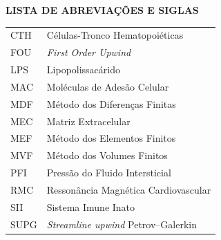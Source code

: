 \clearpage
\clearpage
\begin{center}
\textbf{LISTA DE ABREVIAÇÕES E SIGLAS}
\end{center}

\vspace*{1.cm}

\doublespacing  \begin{tabular}{l l}
CTH& 	 Células-Tronco Hematopoiéticas\\
FOU& 	 \textit{First Order Upwind}\\
LPS& 	 Lipopolissacárido\\
MAC& 	 Moléculas de Adesão Celular\\
MDF&	 Método dos Diferenças Finitas\\
MEC&     Matriz Extracelular\\
MEF&	 Método dos Elementos Finitos\\
MVF&	 Método dos Volumes Finitos\\
PFI&	 Pressão do Fluido Intersticial\\
RMC& 	 Ressonância Magnética Cardiovascular\\
SII&	 Sistema Imune Inato\\
SUPG&	 \textit{Streamline upwind} Petrov–Galerkin\\
\end{tabular}  \thispagestyle{empty}
